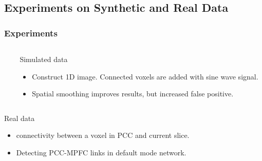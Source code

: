 \documentclass[sansserif, 10pt]{beamer}
\begin{document}
\subsection{Experiments on Synthetic and Real Data}
\begin{frame}
  \frametitle{Experiments}
  \begin{columns}
    \begin{column}{0.6\textwidth}

    \end{column}
    \begin{column}{0.4\textwidth}
       {
        \begin{block}{Simulated data}
          \begin{itemize}
          \item Construct 1D image. Connected voxels are added with sine wave
            signal.
          \item Spatial smoothing improves results, but increased false positive.

          \end{itemize}
        \end{block}
      }
    \end{column}
  \end{columns}
  \vspace{5pt}
  \begin{columns}
    \begin{column}{0.4\textwidth}
       {
        \begin{block}{Real data}
          \begin{itemize}
          \item connectivity between a voxel in PCC and current slice.
          \item Detecting PCC-MPFC links in default mode network.
          \end{itemize}
        \end{block}
      }


\end{column}
\end{columns}
\end{frame}
\end{document}

